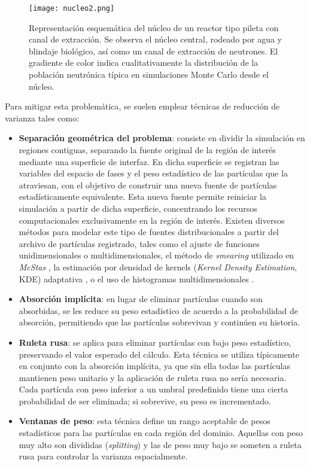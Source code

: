 \begin{figure}[H]
    \centering
    \texttt{[image: nucleo2.png]}
    \caption{Representación esquemática del núcleo de un reactor tipo pileta con canal de extracción. Se observa el núcleo central, rodeado por agua y blindaje biológico, así como un canal de extracción de neutrones. El gradiente de color indica cualitativamente la distribución de la población neutrónica típica en simulaciones Monte Carlo desde el núcleo.}
    \label{fig:nucleo2}
\end{figure}

Para mitigar esta problemática, se suelen emplear técnicas de reducción de varianza tales como:
\begin{itemize}
    \item \textbf{Separación geométrica del problema}: consiste en dividir la simulación en regiones contiguas, separando la fuente original de la región de interés mediante una superficie de interfaz. En dicha superficie se registran las variables del espacio de fases y el peso estadístico de las partículas que la atraviesan, con el objetivo de construir una nueva fuente de partículas estadísticamente equivalente. Esta nueva fuente permite reiniciar la simulación a partir de dicha superficie, concentrando los recursos computacionales exclusivamente en la región de interés. Existen diversos métodos para modelar este tipo de fuentes distribucionales a partir del archivo de partículas registrado, tales como el ajuste de funciones unidimensionales o multidimensionales, el método de \textit{smearing} utilizado en \textit{McStas} \cite{McStas2020Manual}, la estimación por densidad de kernels (\textit{Kernel Density Estimation}, KDE) adaptativa \cite{Schmidt2022KDSourcePaper}, o el uso de histogramas multidimensionales \cite{Fairhurst2017Hist}.
    
    \item \textbf{Absorción implícita}: en lugar de eliminar partículas cuando son absorbidas, se les reduce su peso estadístico de acuerdo a la probabilidad de absorción, permitiendo que las partículas sobrevivan y continúen su historia.
    
    \item \textbf{Ruleta rusa}: se aplica para eliminar partículas con bajo peso estadístico, preservando el valor esperado del cálculo. Esta técnica se utiliza típicamente en conjunto con la absorción implícita, ya que sin ella todas las partículas mantienen peso unitario y la aplicación de ruleta rusa no sería necesaria. Cada partícula con peso inferior a un umbral predefinido tiene una cierta probabilidad de ser eliminada; si sobrevive, su peso es incrementado.

    \item \textbf{Ventanas de peso}: esta técnica define un rango aceptable de pesos estadísticos para las partículas en cada región del dominio. Aquellas con peso muy alto son divididas (\emph{splitting}) y las de peso muy bajo se someten a ruleta rusa para controlar la varianza espacialmente.
\end{itemize}

